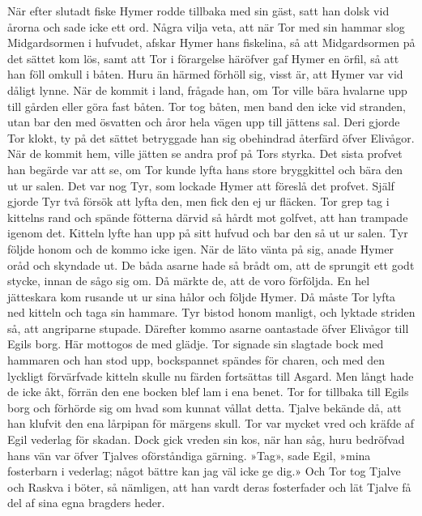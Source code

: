 När efter slutadt fiske Hymer rodde tillbaka med sin gäst, satt han
dolsk vid årorna och sade icke ett ord. Några vilja veta, att när Tor
med sin hammar slog Midgardsormen i hufvudet, afskar Hymer hans
fiskelina, så att Midgardsormen på det sättet kom lös, samt att Tor i
förargelse häröfver gaf Hymer en örfil, så att han föll omkull i båten.
Huru än härmed förhöll sig, visst är, att Hymer var vid dåligt lynne.
När de kommit i land, frågade han, om Tor ville bära hvalarne upp till
gården eller göra fast båten. Tor tog båten, men band den icke vid
stranden, utan bar den med ösvatten och åror hela vägen upp till jättens
sal. Deri gjorde Tor klokt, ty på det sättet betryggade han sig
obehindrad återfärd öfver Elivågor. När de kommit hem, ville jätten se
andra prof på Tors styrka. Det sista profvet han begärde var att se, om
Tor kunde lyfta hans store bryggkittel och bära den ut ur salen. Det var
nog Tyr, som lockade Hymer att föreslå det profvet. Själf gjorde Tyr två
försök att lyfta den, men fick den ej ur fläcken. Tor grep tag i
kittelns rand och spände fötterna därvid så hårdt mot golfvet, att han
trampade igenom det. Kitteln lyfte han upp på sitt hufvud och bar den så
ut ur salen. Tyr följde honom och de kommo icke igen. När de läto vänta
på sig, anade Hymer oråd och skyndade ut. De båda asarne hade så brådt
om, att de sprungit ett godt stycke, innan de sågo sig om. Då märkte de,
att de voro förföljda. En hel jätteskara kom rusande ut ur sina hålor
och följde Hymer. Då måste Tor lyfta ned kitteln och taga sin hammare.
Tyr bistod honom manligt, och lyktade striden så, att angriparne
\protect\hypertarget{lb1625905.xhtmlux5cux23start51}{}{}\protect\hypertarget{lb1625905.xhtmlux5cux23start51-a}{}{}\protect\hypertarget{lb1625905.xhtmlux5cux23start51-b}{}{}\protect\hypertarget{lb1625905.xhtmlux5cux23start51-c}{}{}\protect\hypertarget{lb1625905.xhtmlux5cux23start51-d}{}{}
stupade. Därefter kommo asarne oantastade öfver Elivågor till Egils
borg. Här mottogos de med glädje. Tor signade sin slagtade bock med
hammaren och han stod upp, bockspannet spändes för charen, och med den
lyckligt förvärfvade kitteln skulle nu färden fortsättas till Asgard.
Men långt hade de icke åkt, förrän den ene bocken blef lam i ena benet.
Tor for tillbaka till Egils borg och förhörde sig om hvad som kunnat
vållat detta. Tjalve bekände då, att han klufvit den ena lårpipan för
märgens skull. Tor var mycket vred och kräfde af Egil vederlag för
skadan. Dock gick vreden sin kos, när han såg, huru bedröfvad hans vän
var öfver Tjalves oförståndiga gärning. »Tag», sade Egil, »mina
fosterbarn i vederlag; något bättre kan jag väl icke ge dig.» Och Tor
tog Tjalve och Raskva i böter, så nämligen, att han vardt deras
fosterfader och lät Tjalve få del af sina egna bragders heder.

